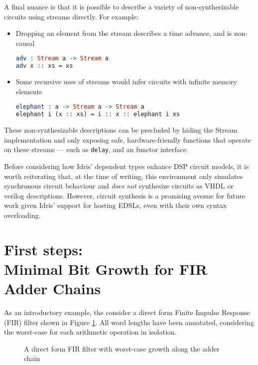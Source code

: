 \documentclass[conference]{IEEEtran}
\begin{document}
A final nuance is that it is possible to describe a variety of non-synthesizable
circuits using streams directly. For example:

\begin{itemize}
\item Dropping an element from the stream describes a time advance, and is
  non-causal
\begin{lstlisting}[language=idris]
adv : Stream a -> Stream a
adv x :: xs = xs
\end{lstlisting}
      
\item Some recursive uses of streams would infer circuits with infinite memory
  elements\cite{baaij_15}
\begin{lstlisting}[language=idris]
elephant : a -> Stream a -> Stream a
elephant i (x :: xs) = i :: x :: elephant i xs
\end{lstlisting}
\end{itemize}

These non-synthesizable descriptions can be precluded by hiding the Stream
implementation and only exposing safe, hardware-friendly functions that operate
on these streams --- such as \texttt{delay}, and an functor interface.

Before considering how Idris' dependent types enhance DSP circuit models, it is
worth reiterating that, at the time of writing, this environment only simulates
synchronous circuit behaviour and \emph{does not} synthesize circuits as VHDL or
verilog descriptions. However, circuit synthesis is a promising avenue for
future work given Idris' support for hosting EDSLs, even with their own syntax
overloading\cite{brady_12}.


\section{First steps:\\Minimal Bit Growth for FIR Adder Chains}

As an introductory example, the consider a direct form Finite Impulse Response
(FIR) filter shown in Figure \ref{fig:fir_direct}. All word lengths have been
annotated, considering the worst-case for each arithmetic operation in
isolation. 

\begin{figure}
  \centering
  
  \caption{A direct form FIR filter with worst-case growth along the adder chain}
  \label{fig:fir_direct}
\end{figure}
\end{document}
